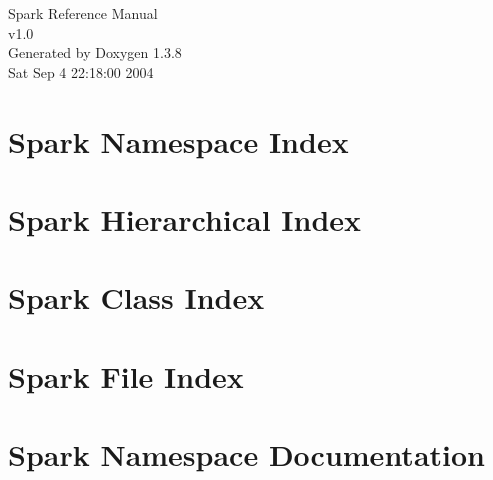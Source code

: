 \documentclass[a4paper]{book}
\begin{document}
\begin{titlepage}
\vspace*{7cm}
\begin{center}
{\Large Spark Reference Manual\\[1ex]\large v1.0 }\\
\vspace*{1cm}
{\large Generated by Doxygen 1.3.8}\\
\vspace*{0.5cm}
{\small Sat Sep 4 22:18:00 2004}\\
\end{center}
\end{titlepage}
\clearemptydoublepage
{}
\tableofcontents
\clearemptydoublepage
{}
\chapter{Spark Namespace Index}

\chapter{Spark Hierarchical Index}

\chapter{Spark Class Index}

\chapter{Spark File Index}

\chapter{Spark Namespace Documentation}


\end{document}
